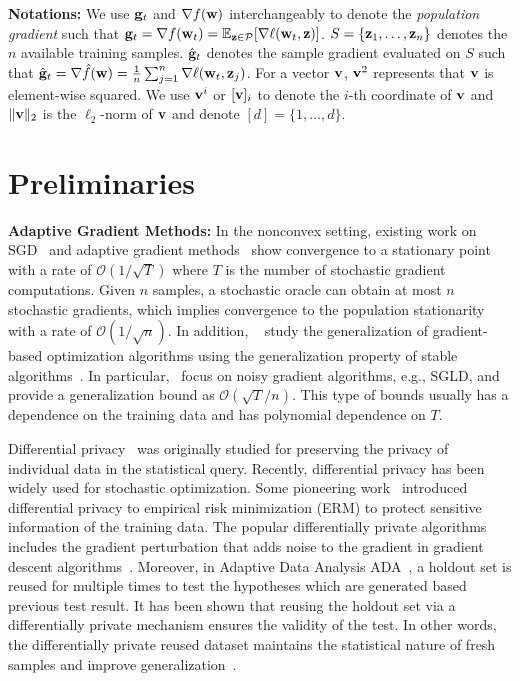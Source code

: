 \documentclass[11pt]{article}
\begin{document}
\textbf{Notations:} 
We use $\mathbf{g}_t$ and $\nabla f(\mathbf{w})$ interchangeably to denote the \emph{population gradient} such that $\g_t = \nabla f(\w_t) = \mathbb{E}_{\z \in \cP} [\nabla \ell(\w_t, \z)]$. 
$S = \left\{\mathbf{z}_{1}, \dots, \mathbf{z}_{n}\right\}$ denotes the $n$ available training samples. 
$\hat {\mathbf{g}}_t$ denotes the sample gradient evaluated on $S$ such that $\hat {\mathbf{g}}_t = \nabla \hat f(\mathbf{w}) = \frac{1}{n}\sum_{j=1}^n \nabla \ell(\mathbf{w}_t, \mathbf{z}_j)$. For a vector $\mathbf{v}$, $\mathbf{v}^2$ represents that $\mathbf{v}$ is element-wise squared.  
We use $\mathbf{v}^i$ or $[\mathbf{v}]_i$ to denote the $i$-th coordinate of $\mathbf{v}$ and $\|\mathbf{v}\|_2$ is the $\ell_2$-norm of $\mathbf{v}$ and denote $[d]=\{1,\dots,d\}$.

\vspace{-0.05in}
\section{Preliminaries}
\vspace{-0.05in}

{\bf Adaptive Gradient Methods:} 
In the nonconvex setting, existing work on SGD~\citep{ghla2013} and adaptive gradient methods~\citep{zare18, wawu19, zosh2019, cheli2019} show convergence to a stationary point with a rate of  $\mathcal{O}(1/\sqrt{T})$ where $T$ is the number of stochastic gradient computations. Given $n$ samples, a stochastic oracle can obtain at most $n$ stochastic gradients, which implies convergence to the population stationarity with a rate of $\mathcal{O}(1/\sqrt{n})$.
In addition, ~\citet{kula2018, rara2017, hare2016,mowa2018, pejo2018, cheli2019, lilu2019} study the generalization of gradient-based optimization algorithms using the generalization property of stable algorithms~\cite{boel02}. 
In particular,~\citet{rara2017, mowa2018, lilu2019, pejo2018} focus on noisy gradient algorithms, e.g., \textsc{SGLD}, and provide a generalization bound as $\mathcal{O}(\sqrt{T}/n)$. 
This type of bounds usually has a dependence on the training data and has polynomial dependence on $T$.  

Differential privacy~\cite{dwro2014} was originally studied for preserving the privacy of individual data in the statistical query. 
Recently, differential privacy has been widely used for stochastic optimization. 
Some pioneering work~\citep{chmo2011, basm2014, waye2017} introduced differential privacy to empirical risk minimization (ERM) to protect sensitive information of the training data. 
The popular differentially private algorithms includes the gradient perturbation that adds noise to the gradient in gradient descent algorithms~\citep{chmo2011,basm2014,waxu2019}.
Moreover, in Adaptive Data Analysis \textsc{ADA}~\citep{dwfe2015a,dwfe2015b,dwfe2015c}, a holdout set is reused for multiple times to test the hypotheses which are generated based previous test result.  
It has been shown that reusing the holdout set via a differentially private mechanism ensures the validity of the test. 
In other words, the differentially private reused dataset maintains the statistical nature of fresh samples and improve generalization~\citep{zhch2018}. 
\end{document}

